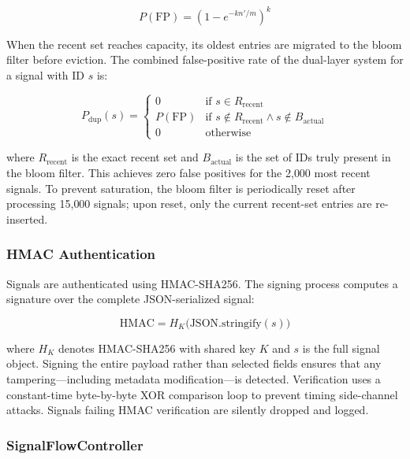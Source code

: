 \documentclass[journal,10pt]{IEEEtran}
\begin{document}
\begin{equation}
P(\text{FP}) = \left(1 - e^{-kn'/m}\right)^k
\label{eq:bloomfp}
\end{equation}

When the recent set reaches capacity, its oldest entries are migrated to the bloom filter before eviction. The combined false-positive rate of the dual-layer system for a signal with ID $s$ is:

\begin{equation}
P_{\text{dup}}(s) = \begin{cases}
0 & \text{if } s \in R_{\text{recent}} \\
P(\text{FP}) & \text{if } s \notin R_{\text{recent}} \wedge s \notin B_{\text{actual}}\\
0 & \text{otherwise}
\end{cases}
\label{eq:dualdedup}
\end{equation}

\noindent where $R_{\text{recent}}$ is the exact recent set and $B_{\text{actual}}$ is the set of IDs truly present in the bloom filter. This achieves zero false positives for the 2{,}000 most recent signals. To prevent saturation, the bloom filter is periodically reset after processing 15{,}000 signals; upon reset, only the current recent-set entries are re-inserted.

\subsubsection{HMAC Authentication}

Signals are authenticated using HMAC-SHA256. The signing process computes a signature over the complete JSON-serialized signal:

\begin{equation}
\text{HMAC} = H_K\bigl(\text{JSON.stringify}(s)\bigr)
\label{eq:hmac}
\end{equation}

\noindent where $H_K$ denotes HMAC-SHA256 with shared key $K$ and $s$ is the full signal object. Signing the entire payload rather than selected fields ensures that any tampering---including metadata modification---is detected. Verification uses a constant-time byte-by-byte XOR comparison loop to prevent timing side-channel attacks. Signals failing HMAC verification are silently dropped and logged.

\subsubsection{SignalFlowController}
\end{document}
